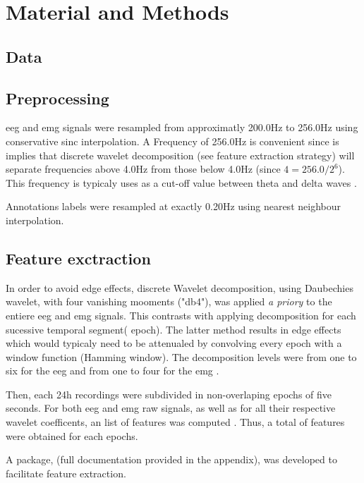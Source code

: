 \section{Material and Methods} \label{matmet}


\subsection{Data}


\subsection{Preprocessing}

\gls{eeg} and \gls{emg} signals were resampled from approximatly 200.0Hz to 256.0Hz using
conservative sinc interpolation. 
A Frequency of 256.0Hz is convenient since is implies that discrete wavelet decomposition (see feature extraction strategy) will separate 
frequencies above 4.0Hz from those below 4.0Hz (since $4 = 256.0/{2^6} $).
This frequency is typicaly uses as a cut-off value between theta and delta waves \citationneeded{}.

Annotations labels were resampled at exactly 0.20Hz using nearest neighbour interpolation.

\subsection{Feature exctraction}

In order to avoid edge effects, discrete Wavelet decomposition, using Daubechies wavelet, with four vanishing mooments ("db4"),
was applied \emph{a priory} to the entiere \gls{eeg} and \gls{emg} signals.
This contrasts with applying decomposition for each sucessive temporal segment(\ie{} epoch).
The latter method results in edge effects which would typicaly need to be attenualed by convolving every epoch with a window function (\eg Hamming window).
The decomposition levels were from one to six for the \gls{eeg} and from one to four for the \gls{emg} .

Then, each 24h recordings were subdivided in non-overlaping epochs of five seconds.
For both \gls{eeg} and \gls{emg} raw signals, as well as for all their respective wavelet coefficents, an list of  features was computed .
Thus, a total of  features were obtained for each epochs.

A \py{} package, \pr{} (full documentation provided in the appendix), was developed to facilitate feature extraction.


